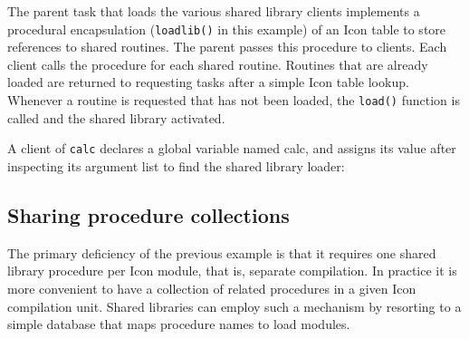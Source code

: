 The parent task that loads the various shared library clients implements
a procedural encapsulation ({\texttt{loadlib()}} in
this example) of an Icon table to store references to shared routines.
The parent passes this procedure to clients. Each client calls the
procedure for each shared routine. Routines that are already loaded are
returned to requesting tasks after a simple Icon table lookup. Whenever
a routine is requested that has not been loaded, the
{\texttt{load()}} function is called and the shared
library activated. 


A client of {\texttt{calc}} declares a global variable named {\textrm{calc}},
and assigns its value after inspecting its argument list to find the shared
library loader:


\subsection{Sharing procedure collections}

The primary deficiency of the previous example is that it requires one
shared library procedure per Icon module, that is, separate
compilation. In practice it is more convenient to have a collection of
related procedures in a given Icon compilation unit. Shared libraries
can employ such a mechanism by resorting to a simple database that
maps procedure names to load modules.

